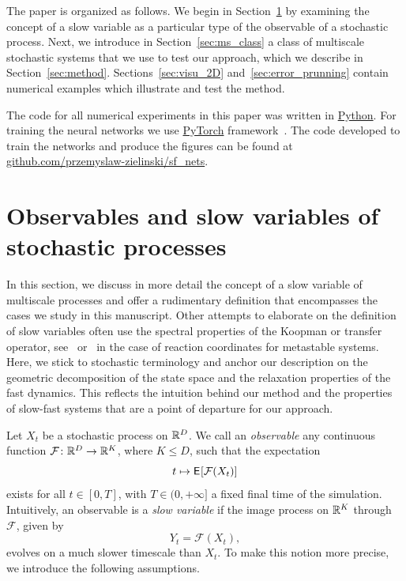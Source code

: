 \documentclass{article}
\newcommand{\obs}{\mathcal{F}} %
\begin{document}
The paper is organized as follows. We begin in Section~\ref{sec:slow_observables} by examining the concept of a slow variable as a particular type of the observable of a stochastic process. Next, we introduce in Section~\ref{sec:ms_class} a class of multiscale stochastic systems that we use to test our approach, which we describe in Section~\ref{sec:method}. Sections~\ref{sec:visu_2D} and~\ref{sec:error_prunning} contain numerical examples which illustrate and test the method.

The code for all numerical experiments in this paper was written in \href{https://www.python.org/}{Python}. For training the neural networks we use \href{https://pytorch.org/}{PyTorch} framework~\cite{paszke_pytorch_2019}. The code developed to train the networks and produce the figures can be found at \href{https://github.com/przemyslaw-zielinski/sf_nets}{github.com/przemyslaw-zielinski/sf\_nets}.

\section{Observables and slow variables of stochastic processes}
\label{sec:slow_observables}
In this section, we discuss in more detail the concept of a slow variable of multiscale processes and offer a rudimentary definition that encompasses the cases we study in this manuscript. Other attempts to elaborate on the definition of slow variables often use the spectral properties of the Koopman or transfer operator, see~\cite{froyland_computational_2014, froyland_trajectory-free_2016} or~\cite{bittracher_transition_2018} in the case of reaction coordinates for metastable systems. Here, we stick to stochastic terminology and anchor our description on the geometric decomposition of the state space and the relaxation properties of the fast dynamics. This reflects the intuition behind our method and the properties of slow-fast systems that are a point of departure for our approach.

Let $X_t$ be a stochastic process on $\mathbb{R}^D$. We call an \emph{observable} any continuous function $\obs\from\R^D\to\R^K$, where $K\leq D$, such that the expectation
\begin{equation*}
    t\mapsto\Exp[][\obs(X_t)]
\end{equation*}
exists for all $t\in[0,T]$, with $T\in(0,+\infty]$ a fixed final time of the simulation. Intuitively, an observable is a \emph{slow variable} if the image process on $\mathbb{R}^K$ through $\obs$, given by
\begin{equation*}
    Y_t = \obs(X_t),
\end{equation*}
evolves on a much slower timescale than $X_t$. To make this notion more precise, we introduce the following assumptions.
\end{document}
